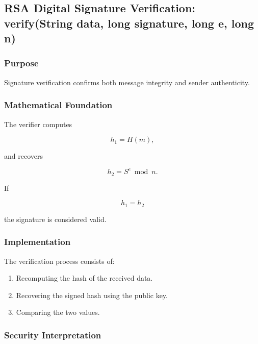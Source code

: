 \documentclass[12pt]{article}
\begin{document}

\subsection{RSA Digital Signature Verification: \\ 
verify(String data, long signature, long e, long n)}

\subsubsection{Purpose}

Signature verification confirms both message integrity and sender authenticity.

\subsubsection{Mathematical Foundation}

The verifier computes

\begin{equation}
h_1 = H(m),
\end{equation}

and recovers

\begin{equation}
h_2 = S^e \bmod n.
\end{equation}

If

\begin{equation}
h_1 = h_2
\end{equation}

the signature is considered valid.

\subsubsection{Implementation}

The verification process consists of:

\begin{enumerate}
\item Recomputing the hash of the received data.
\item Recovering the signed hash using the public key.
\item Comparing the two values.
\end{enumerate}

\subsubsection{Security Interpretation}
\end{document}
